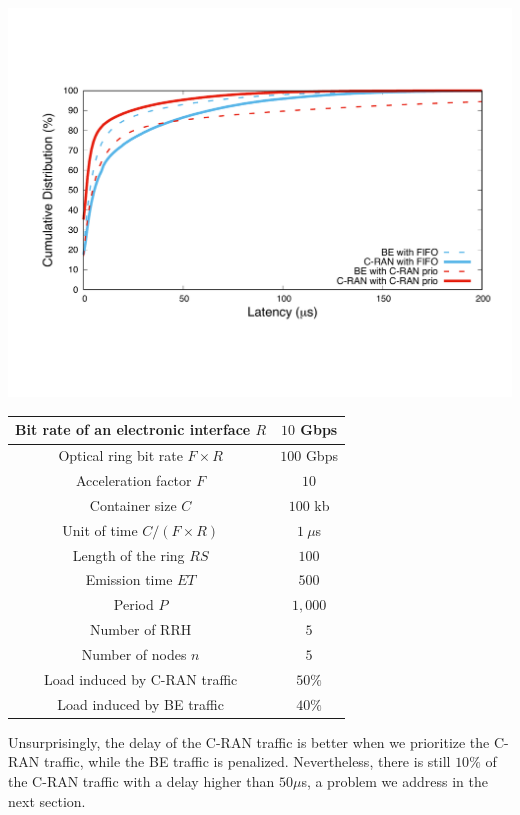 \documentclass[10pt, conference, letterpaper]{IEEEtran}
\begin{document}
   \vspace{0.5cm}
  \hspace{-0.75cm}


        \begin{center}
      \includegraphics[scale=0.3]{opport.pdf}

         \label{fig:resultopport}

  \scalebox{0.65}
  {

  \begin{tabular}{|c|c|}
  \hline
  Bit rate of an electronic interface $R$ & $10$ Gbps \tabularnewline
  \hline
  Optical ring bit rate $F\times R$ & $100$ Gbps \tabularnewline
  \hline
    Acceleration factor $F$ & $10$  \tabularnewline
  \hline
  Container size  $C$ & $100$ kb  \tabularnewline
  \hline
  Unit of time $C/(F\times R)$ & $1~\mu$s \tabularnewline
  \hline
  Length of the ring $RS$ & $100$ \tabularnewline
  \hline
  Emission time $ET$ & $500$ \tabularnewline
  \hline
   Period $P$ & $1,000$ \tabularnewline
  \hline
  Number of RRH & $5$  \tabularnewline
  \hline
  Number of nodes $n$ & $5$  \tabularnewline
  \hline
   Load induced by C-RAN traffic & $50\%$  \tabularnewline
  \hline
    Load induced by BE traffic & $40\%$  \tabularnewline
  \hline
  \end{tabular}
  }

  \label{fig:params}
      \end{center}

Unsurprisingly, the delay of the C-RAN traffic is better when we prioritize the C-RAN traffic, while the BE traffic is penalized. Nevertheless, there is still $10\%$ of the C-RAN traffic with a delay higher than $50 \mu$s, a problem we address in the next section.
\end{document}
